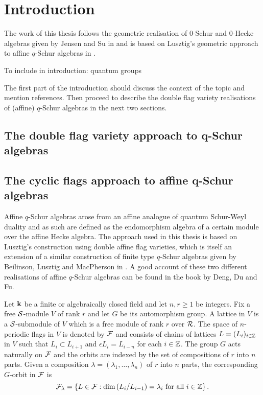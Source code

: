 \documentclass[a4paper, 11pt]{report}
\begin{document}
\maketitle
\tableofcontents

\chapter{Introduction}

The work of this thesis follows the geometric realisation of $0$-Schur and $0$-Hecke algebras given by Jensen and Su in \cite{su12} and is based on Lusztig's geometric approach to affine $q$-Schur algebras in \cite{lusztig99}.


{\color{gray}

To include in introduction:
quantum groups


The first part of the introduction should discuss the context of the topic and mention references. Then proceed to describe the double flag variety realisations of (affine) $q$-Schur algebras in the next two sections.
}

\section{The double flag variety approach to q-Schur algebras}

\section{The cyclic flags approach to affine q-Schur algebras}

Affine $q$-Schur algebras arose from an affine analogue of quantum Schur-Weyl duality and as such are defined as the endomorphism algebra of a certain module over the affine Hecke algebra. The approach used in this thesis is based on Lusztig's construction using double affine flag varieties, which is itself an extension of a similar construction of finite type $q$-Schur algebras given by Beilinson, Lusztig and MacPherson in \cite{blm90}. A good account of these two different realisations of affine $q$-Schur algebras can be found in the book \cite{deng12} by Deng, Du and Fu.

Let $\mathbf{k}$ be a finite or algebraically closed field and let $n,r\geq 1$ be integers. Fix a free $\mathcal{S}$-module $V$ of rank $r$ and let $G$ be its automorphism group. A lattice in $V$ is a $\mathcal{S}$-submodule of $V$ which is a free module of rank $r$ over $\mathcal{R}$. The space of $n$-periodic flags in $V$ is denoted by $\mathcal{F}$ and consists of chains of lattices $L=(L_i)_{i\in\mathbb{Z}}$ in $V$ such that $L_i\subset L_{i+1}$ and $\epsilon L_i = L_{i-n}$ for each $i\in\mathbb{Z}$. The group $G$ acts naturally on $\mathcal{F}$ and the orbits are indexed by the set  of compositions of $r$ into $n$ parts. Given a composition $\lambda=(\lambda_1,\ldots,\lambda_n)$ of $r$ into $n$ parts, the corresponding $G$-orbit in $\mathcal{F}$ is
\begin{equation*}
\mathcal{F}_\lambda = \left\{L\in\mathcal{F}:\dim\left(L_i/{L_{i-1}}\right)=\lambda_i \text{ for all }i\in\mathbb{Z}\right\}.
\end{equation*}
\end{document}
